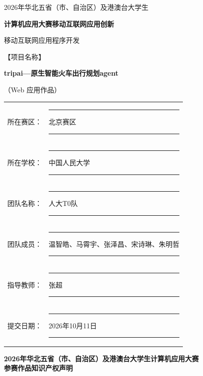 ﻿\documentclass[12pt,a4paper,UTF8,fontset=windows]{ctexart}
\begin{document}
\pagestyle{plain}   %

\begin{titlepage}
  \centering
  {\Large 2026年华北五省（市、自治区）及港澳台大学生\par}
  \vspace{0.6em}
  {\huge\bfseries 计算机应用大赛\quad 移动互联网应用创新\par}
  \vspace{0.5em}
  {\Large 移动互联网应用程序开发\par}
  \vspace{5.5em}
  {\large 【项目名称】\par}
  \vspace{0.3em}
  {\LARGE\bfseries tripai—原生智能火车出行规划agent\par}
  \vspace{0.8em}
  {\large （Web 应用作品）\par}
  \vspace{6.5em}
  \begin{flushleft}
    \hspace*{4em}
    \begin{tabular}{@{}r@{\ }l@{}}
      所在赛区： & \rule[-0.2em]{3cm}{0.4pt}北京赛区 \rule[-0.2em]{3cm}{0.4pt} \\
      所在学校： & \rule[-0.2em]{2cm}{0.4pt}中国人民大学 \rule[-0.2em]{2cm}{0.4pt} \\
      团队名称： & \rule[-0.2em]{2cm}{0.4pt}人大T0队 \rule[-0.2em]{2cm}{0.4pt} \\
      团队成员： & \rule[-0.2em]{1cm}{0.4pt}温智皓、马霄宇、张泽昌、宋诗琳、朱明哲 \rule[-0.2em]{1cm}{0.4pt} \\
      指导教师： & \rule[-0.2em]{3cm}{0.4pt}张超 \rule[-0.2em]{3cm}{0.4pt} \\
      提交日期： & \rule[-0.2em]{2cm}{0.4pt}2026年10月11日 \rule[-0.2em]{2cm}{0.4pt} \\
    \end{tabular}
  \end{flushleft}
\end{titlepage}

\begin{center}
  {\large\bfseries 2026年华北五省（市、自治区）及港澳台大学生计算机应用大赛}\\[0.35em]
  {\Large\bfseries 参赛作品知识产权声明}
\end{center}

\vspace{0.7em}
\end{document}

